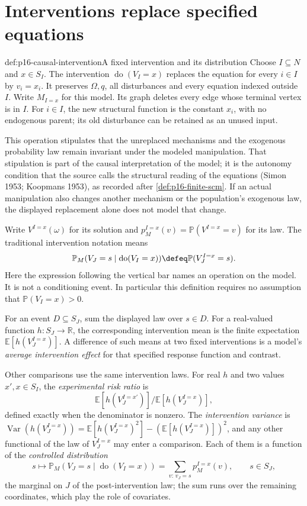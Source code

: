 \section{Interventions replace specified equations}
\label{sec:p16-finite-interventions}

\begin{hbdefinition}{def:p16-causal-intervention}{A fixed intervention and its distribution}
Choose \(I\subseteq N\) and \(x\in S_I\). The intervention
\(\operatorname{do}(V_I=x)\) replaces the equation for every \(i\in I\)
by \(v_i=x_i\). It preserves \(\Omega,q\), all disturbances and
every equation indexed outside \(I\). Write \(M_{I=x}\) for this
model. Its graph deletes every edge whose terminal vertex is in \(I\).
For \(i\in I\), the new structural function is the constant \(x_i\),
with no endogenous parent; its old disturbance can be retained as an
unused input.

This operation stipulates that the unreplaced mechanisms and the
exogenous probability law remain invariant under the modeled manipulation.
That stipulation is part of the causal interpretation of the model; it
is the autonomy condition that the source calls the structural reading
of the equations (Simon 1953; Koopmans 1953), as recorded after
\cref{def:p16-finite-scm}. If an
actual manipulation also changes another mechanism or the population's
exogenous law, the displayed replacement alone does not model that change.

Write \(V^{I=x}(\omega)\) for its solution and
\(p_M^{I=x}(v)=\mathbb P(V^{I=x}=v)\) for its law. The traditional
intervention notation means
\[
 \mathbb P_M(V_J=s\mid\operatorname{do}(V_I=x))
 \defeq\mathbb P(V_J^{I=x}=s).
\]
Here the expression following the vertical bar names an operation on the
model. It is not a conditioning event. In particular this definition
requires no assumption that \(\mathbb P(V_I=x)>0\).

For an event \(D\subseteq S_J\), sum the displayed law over \(s\in D\).
For a real-valued function \(h:S_J\to\mathbb R\), the corresponding
intervention mean is the finite expectation
\(\mathbb E[h(V_J^{I=x})]\). A difference of such means at two fixed
interventions is a model's \emph{average intervention effect} for that
specified response function and contrast.

Other comparisons use the same intervention laws. For real \(h\) and
two values \(x',x\in S_I\), the \emph{experimental risk ratio} is
\[
 \mathbb E[h(V_J^{I=x'})]\big/\mathbb E[h(V_J^{I=x})],
\]
defined exactly when the denominator is nonzero. The \emph{intervention
variance} is
\(\operatorname{Var}(h(V_J^{I=x}))=\mathbb E[h(V_J^{I=x})^2]
-(\mathbb E[h(V_J^{I=x})])^2\), and any other functional of the law of
\(V_J^{I=x}\) may enter a comparison. Each of them is a function of the
\emph{controlled distribution}
\[
 s\longmapsto\mathbb P_M(V_J=s\mid\operatorname{do}(V_I=x))
 =\sum_{v:\,v_J=s}p_M^{I=x}(v),\qquad s\in S_J,
\]
the marginal on \(J\) of the post-intervention law; the sum runs over
the remaining coordinates, which play the role of covariates.
\end{hbdefinition}

